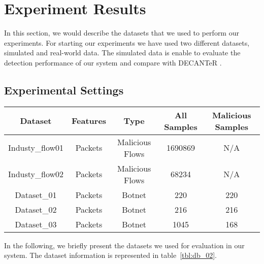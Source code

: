 \section{Experiment Results}

In this section, we would describe the datasets that we used to perform our experiments. For starting our experiments we have used two different datasets, simulated and real-world data. The simulated data is enable to evaluate the detection performance of our system and compare with DECANTeR \cite{bortolameotti2017decanter}.


\subsection{Experimental Settings}

\begin{table*}[!h]
\centering
\caption{Overview of the Datasets}
\label{tbl:db_02}
\begin{tabular}{|c|c|c|c|c|}
\hline
Dataset         & Features & Type            & All Samples & Malicious Samples \\ \hline
Industy\_flow01 & Packets  & Malicious Flows & 1690869     & N/A               \\ \hline
Industy\_flow02 & Packets  & Malicious Flows & 68234       & N/A               \\ \hline
Dataset\_01     & Packets  & Botnet          & 220         & 220               \\ \hline
Dataset\_02     & Packets  & Botnet          & 216         & 216               \\ \hline
Dataset\_03     & Packets  & Botnet          & 1045         & 168               \\ \hline
\end{tabular}
\end{table*}


In the following, we briefly present the datasets we used for evaluation in our system. The dataset information is represented in table~\ref{tbl:db_02}.

